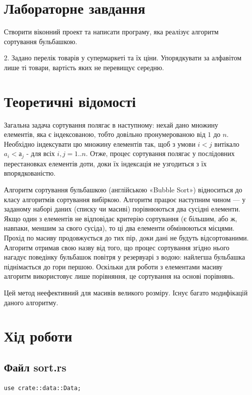 \documentclass{article}
\begin{document}
\begin{normalsize}
	\section*{Лабораторне завдання}
	Створити віконний проект та написати програму, яка реалізує алгоритм сортування бульбашкою.
	\begin{center}
		2. Задано перелік товарів у супермаркеті та їх ціни. Упорядкувати за алфавітом лише ті товари, вартість яких не перевищує середню.
	\end{center}
	
	\section*{Теоретичні відомості}
	Загальна задача сортування полягає в наступному: нехай дано множину елементів, яка є індексованою, тобто довільно пронумерованою від $1$ до $n$. Необхідно індексувати цю множину елементів так, щоб з умови $i<j$ витікало $a_i < а_j$ - для всіх $i,j=1..n$. Отже, процес сортування полягає у послідовних перестановках елементів доти, доки їх індексація не узгодиться з їх впорядкованістю.
	
	Алгоритм сортування бульбашкою (англійською «Bubble Sort») відноситься до класу алгоритмів сортування вибіркою. Алгоритм працює наступним чином — у заданому наборі даних (списку чи масиві) порівнюються два сусідні елементи. Якщо один з елементів не відповідає критерію сортування (є більшим, або ж, навпаки, меншим за свого сусіда), то ці два елементи обмінюються місцями. Прохід по масиву продовжується до тих пір, доки дані не будуть відсортованими. 
	Алгоритм отримав свою назву від того, що процес сортування згідно нього нагадує поведінку бульбашок повітря у резервуарі з водою: найлегша бульбашка піднімається до гори першою. Оскільки для роботи з елементами масиву алгоритм використовує лише порівняння, це сортування на основі порівнянь.
	
	Цей метод неефективний для масивів великого розміру. Існує багато модифікацій даного алгоритму.
	
	\section*{Хід роботи}
	\subsection*{Файл sort.rs}
	\begin{lstlisting}
use crate::data::Data;


\end{lstlisting}
\end{normalsize}
\end{document}
